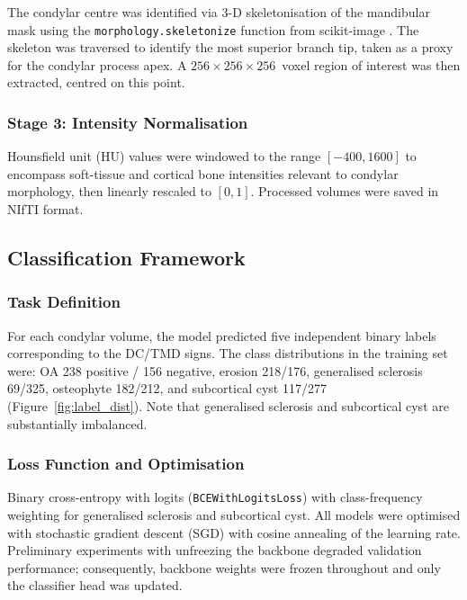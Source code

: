 \documentclass[review,12pt]{elsarticle}
\begin{document}
The condylar centre was identified via 3-D skeletonisation of the
mandibular mask using the \texttt{morphology.skeletonize} function from
scikit-image \cite{van2014scikit}. The skeleton was traversed to identify
the most superior branch tip, taken as a proxy for the condylar process
apex. A $256 \times 256 \times 256$~voxel region of interest was then
extracted, centred on this point.

\subsubsection{Stage 3: Intensity Normalisation}

Hounsfield unit (HU) values were windowed to the range $[-400, 1600]$
to encompass soft-tissue and cortical bone intensities relevant to
condylar morphology, then linearly rescaled to $[0, 1]$. Processed
volumes were saved in NIfTI format.

\subsection{Classification Framework}
\label{sec:framework}

\subsubsection{Task Definition}

For each condylar volume, the model predicted five independent binary
labels corresponding to the DC/TMD signs. The class distributions in the
training set were: OA 238 positive / 156 negative, erosion 218/176,
generalised sclerosis 69/325, osteophyte 182/212, and subcortical cyst
117/277 (Figure~\ref{fig:label_dist}). Note that generalised sclerosis and subcortical cyst are
substantially imbalanced.

\subsubsection{Loss Function and Optimisation}

Binary cross-entropy with logits (\texttt{BCEWithLogitsLoss}) with
class-frequency weighting for generalised sclerosis and subcortical cyst. All models were
optimised with stochastic gradient descent (SGD) with cosine annealing
of the learning rate. Preliminary experiments with unfreezing the
backbone degraded validation performance; consequently, backbone weights
were frozen throughout and only the classifier head was updated.
\end{document}

